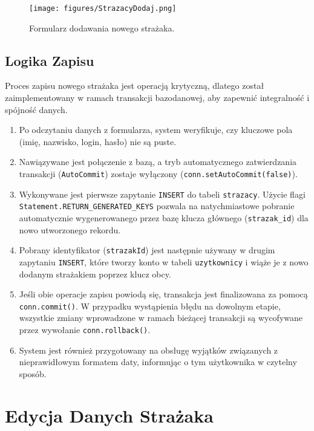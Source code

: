 \begin{figure}[H]
	\centering
	\texttt{[image: figures/StrazacyDodaj.png]}
	\caption{Formularz dodawania nowego strażaka.}
	\label{fig:strazacy_dodaj_form}
\end{figure}

\subsection{Logika Zapisu}
\label{ssec:logika_zapisu}

Proces zapisu nowego strażaka jest operacją krytyczną, dlatego został zaimplementowany w ramach transakcji bazodanowej, aby zapewnić integralność i spójność danych.
\begin{enumerate}
    \item Po odczytaniu danych z formularza, system weryfikuje, czy kluczowe pola (imię, nazwisko, login, hasło) nie są puste.
    \item Nawiązywane jest połączenie z bazą, a tryb automatycznego zatwierdzania transakcji (\texttt{AutoCommit}) zostaje wyłączony (\texttt{conn.setAutoCommit(false)}).
    \item Wykonywane jest pierwsze zapytanie \texttt{INSERT} do tabeli \texttt{strazacy}. Użycie flagi \texttt{Statement.RETURN\_GENERATED\_KEYS} pozwala na natychmiastowe pobranie automatycznie wygenerowanego przez bazę klucza głównego (\texttt{strazak\_id}) dla nowo utworzonego rekordu.
    \item Pobrany identyfikator (\texttt{strazakId}) jest następnie używany w drugim zapytaniu \texttt{INSERT}, które tworzy konto w tabeli \texttt{uzytkownicy} i wiąże je z nowo dodanym strażakiem poprzez klucz obcy.
    \item Jeśli obie operacje zapisu powiodą się, transakcja jest finalizowana za pomocą \texttt{conn.commit()}. W przypadku wystąpienia błędu na dowolnym etapie, wszystkie zmiany wprowadzone w ramach bieżącej transakcji są wycofywane przez wywołanie \texttt{conn.rollback()}.
    \item System jest również przygotowany na obsługę wyjątków związanych z nieprawidłowym formatem daty, informując o tym użytkownika w czytelny sposób.
\end{enumerate}

\section{Edycja Danych Strażaka}
\label{sec:strazacy_edycja}

